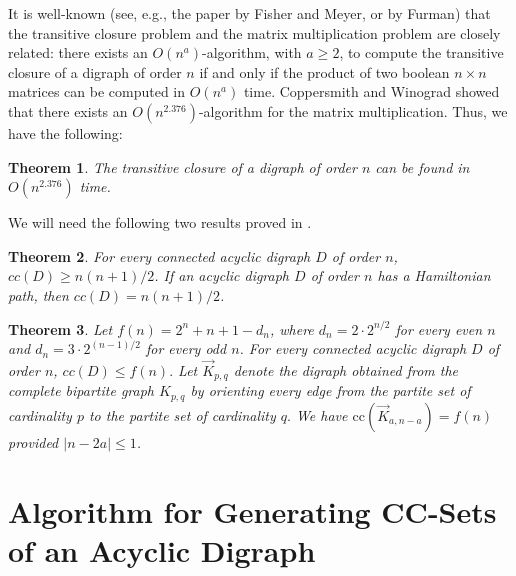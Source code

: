 \documentclass[11pt]{article}
\newcommand{\2}{\vspace{0.2 cm}}
\newtheorem{theorem}{Theorem}[section]
\newcommand\cc{\mathrm{cc}}
\begin{document}
\vspace{3mm}

It is well-known  (see, e.g., the paper
\cite{fisher1971}  by Fisher and Meyer, or \cite{furmanSMD11} by
Furman) that the transitive closure problem and the matrix
multiplication problem are closely related: there exists an
$O(n^a)$-algorithm, with $a\ge 2$, to compute the transitive
closure of a digraph of order $n$ if and only if the product of
two boolean $n\times n$ matrices can be computed in $O(n^a)$ time. 
Coppersmith and Winograd \cite{coppersmith1987}
showed that there exists an $O(n^{2.376})$-algorithm for the
matrix multiplication. Thus, we have the following:

\begin{theorem}\label{remtr}
The transitive closure of a digraph of order $n$ can be found in
$O(n^{2.376})$ time. 
\end{theorem}

We will need the following two results proved in \cite{GuYe}.

\begin{theorem} \label{lower_bound}
For every connected acyclic  digraph $D$ of order $n$,  $cc(D) \geq
  n(n+1)/2$. If an acyclic digraph $D$ of order $n$ has a Hamiltonian path, then
  $cc(D)=n(n+1)/2$.
\end{theorem}

\begin{theorem}\label{upper_bound}
Let $f(n)=2^n+n+1-d_n$, where $d_n=2\cdot 2^{n/2}$ for every even
$n$ and $d_n=3\cdot 2^{(n-1)/2}$ for every odd $n$. For every
connected acyclic  digraph $D$ of order $n$,  $cc(D) \leq f(n).$ Let
$\vec{K}_{p,q}$ denote the digraph obtained from the complete
bipartite graph $K_{p,q}$ by orienting every edge from the partite
set of cardinality $p$ to the partite set of cardinality $q.$ We
have $\cc(\vec{K}_{a,n-a})=f(n)$ provided $|n-2a|\le 1$.
\end{theorem}




\section{Algorithm for Generating CC-Sets of an Acyclic
Digraph}\label{ccsec}
\end{document}
